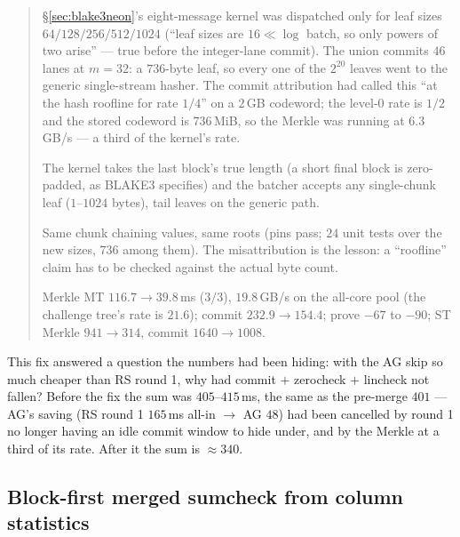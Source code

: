 \documentclass[11pt]{article}
\newenvironment{optsummary}{%
  \begin{quote}\small
  \begin{description}
  \setlength{\itemsep}{1pt}\setlength{\parsep}{0pt}\setlength{\topsep}{2pt}
}{%
  \end{description}
  \end{quote}
}
\begin{document}
\begin{optsummary}
\item[Baseline:] \S\ref{sec:blake3neon}'s eight-message kernel was dispatched only for leaf sizes $64/128/256/512/1024$ (``leaf sizes are $16\ll\log$ batch, so only powers of two arise'' --- true before the integer-lane commit). The union commits $46$ lanes at $m{=}32$: a $736$-byte leaf, so every one of the $2^{20}$ leaves went to the generic single-stream hasher. The commit attribution had called this ``at the hash roofline for rate $1/4$'' on a $2\,$GB codeword; the level-0 rate is $1/2$ and the stored codeword is $736\,$MiB, so the Merkle was running at $6.3\,$GB/s --- a third of the kernel's rate.
\item[Improvement:] The kernel takes the last block's true length (a short final block is zero-padded, as BLAKE3 specifies) and the batcher accepts any single-chunk leaf ($1$--$1024$ bytes), tail leaves on the generic path.
\item[Mechanism:] Same chunk chaining values, same roots (pins pass; $24$ unit tests over the new sizes, $736$ among them). The misattribution is the lesson: a ``roofline'' claim has to be checked against the actual byte count.
\item[Result:] Merkle MT $116.7\to39.8\,$ms ($3/3$), $19.8\,$GB/s on the all-core pool (the challenge tree's rate is $21.6$); commit $232.9\to154.4$; prove $-67$ to $-90$; ST Merkle $941\to314$, commit $1640\to1008$.
\end{optsummary}

This fix answered a question the numbers had been hiding: with the AG
skip so much cheaper than RS round 1, why had commit $+$ zerocheck $+$
lincheck not fallen? Before the fix the sum was $405$--$415\,$ms, the same
as the pre-merge $401$ --- AG's saving (RS round 1 $165\,$ms all-in
$\to$ AG $48$) had been cancelled by round 1 no longer having an idle
commit window to hide under, and by the Merkle at a third of its rate.
After it the sum is $\approx340$.

\subsection{Block-first merged sumcheck from column statistics}\label{sec:blockfirst}
\end{document}
